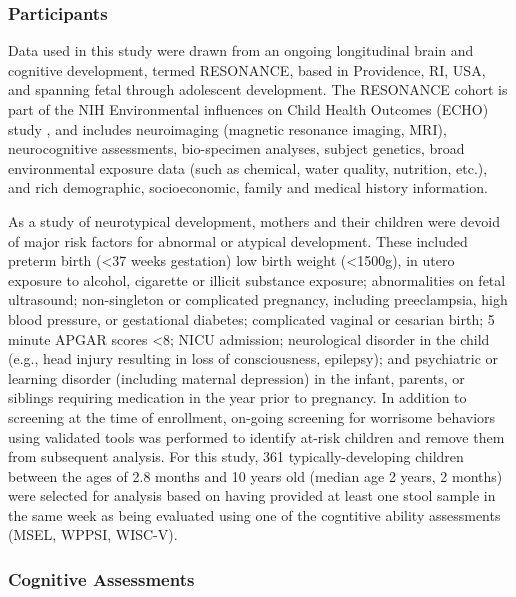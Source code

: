 \documentclass{article}
\begin{document}
\subsubsection*{Participants}

Data used in this study were drawn from an ongoing longitudinal
brain and cognitive development, termed RESONANCE, based in Providence, RI, USA,
and spanning fetal through adolescent development. The
RESONANCE cohort is part of the NIH Environmental influences
on Child Health Outcomes (ECHO) study
\cite{forrestAdvancingScienceChildren2018,gillmanEnvironmentalInfluencesChild2018},
and includes neuroimaging (magnetic
resonance imaging, MRI), neurocognitive assessments, bio-specimen
analyses, subject genetics, broad environmental exposure data
(such as chemical, water quality, nutrition, etc.), and
rich demographic, socioeconomic, family and medical history information.

As a study of neurotypical development, mothers and their children
were devoid of major risk factors for abnormal or atypical development.
These included preterm birth (\textless 37 weeks gestation) low birth weight (\textless 1500g),
in utero exposure to alcohol, cigarette or illicit substance exposure;
abnormalities on fetal ultrasound; non-singleton or complicated pregnancy,
including preeclampsia, high blood pressure, or gestational diabetes;
complicated vaginal or cesarian birth; 5 minute APGAR scores \textless 8;
NICU admission; neurological disorder in the child
(e.g., head injury resulting in loss of consciousness, epilepsy);
and psychiatric or learning disorder (including maternal depression)
in the infant, parents, or siblings requiring medication in the year prior to pregnancy.
In addition to screening at
the time of enrollment, on-going screening for worrisome behaviors using
validated tools was performed to identify at-risk children and remove
them from subsequent analysis.
For this study, 361 typically-developing children between the
ages of 2.8 months and 10 years old (median age 2 years, 2 months) were
selected for analysis based on having provided at least one stool sample
in the same week as being evaluated using one of the cogntitive ability
assessments (MSEL, WPPSI, WISC-V).

\subsubsection*{Cognitive Assessments}
\end{document}
